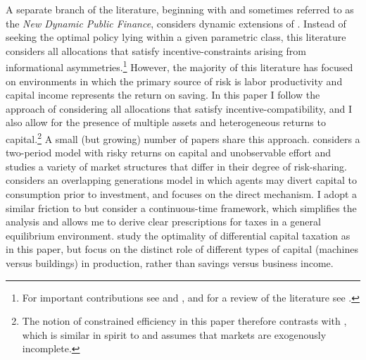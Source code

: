 \documentclass[11pt]{article}
\theoremstyle{plain}
\theoremstyle{definition} %
\begin{document}
A separate branch of the literature, beginning with \cite{golosov_optimal_2003} and sometimes referred to as the \textit{New Dynamic Public Finance}, considers dynamic extensions of \cite{mirrlees_exploration_1971}. Instead of seeking the optimal policy lying within a given parametric class, this literature considers all allocations that satisfy incentive-constraints arising from informational asymmetries.\footnote{For important contributions see \cite{farhi_insurance_2013} and \cite{golosov_redistribution_2016}, and for a review of the literature see \cite{golosov_policy_2015}.} However, the majority of this literature has focused on environments in which the primary source of risk is labor productivity and capital income represents the return on saving. In this paper I follow the approach of considering all allocations that satisfy incentive-compatibility, and I also allow for the presence of multiple assets and heterogeneous returns to capital.\footnote{The notion of constrained efficiency in this paper therefore contrasts with \cite{davila_constrained_2012}, which is similar in spirit to \cite{geanakoplos_existence_1985} and assumes that markets are exogenously incomplete.} A small (but growing) number of papers share this approach. \cite{albanesi_optimal_2006} considers a two-period model with risky returns on capital and unobservable effort and studies a variety of market structures that differ in their degree of risk-sharing. \cite{shourideh_optimal_2013} considers an overlapping generations model in which agents may divert capital to consumption prior to investment, and focuses on the direct mechanism. I adopt a similar friction to \cite{shourideh_optimal_2013} but consider a continuous-time framework, which simplifies the analysis and allows me to derive clear prescriptions for taxes in a general equilibrium environment. \cite{slavik_machines_2014} study the optimality of differential capital taxation as in this paper, but focus on the distinct role of different types of capital (machines versus buildings) in production, rather than savings versus business income. 
\end{document}
